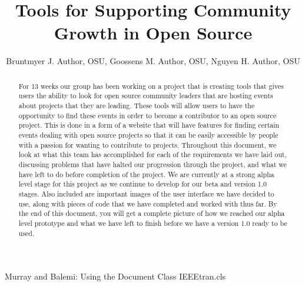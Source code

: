\documentclass[letterpaper,10pt,onecolumn]{IEEEtran} %
\begin{document}
\title{Tools for Supporting Community Growth in Open Source } %

\author{Bruntmyer J. Author, OSU, Goossens M. Author, OSU, Nguyen H. Author, OSU}

{Murray and Balemi: Using the Document Class IEEEtran.cls} %


\maketitle

\begin{abstract}
For 13 weeks our group has been working on a project that is creating tools that gives users the ability to look for open source community leaders that are hosting events about projects that they are leading. These tools will allow users to have the opportunity to find these events in order to become a contributor to an open source project. This is done in a form of a website that will have features for finding certain events dealing with open source projects so that it can be easily accessible by people with a passion for wanting to contribute to projects. Throughout this document, we look at what this team has accomplished for each of the requirements we have laid out, discussing problems that have halted our progression through the project, and what we have left to do before completion of the project. We are currently at a strong alpha level stage for this project as we continue to develop for our beta and version 1.0 stages. Also included are important images of the user interface we have decided to use, along with pieces of code that we have completed and worked with thus far. By the end of this document, you will get a complete picture of how we reached our alpha level prototype and what we have left to finish before we have a version 1.0 ready to be used.
\end{abstract}

\newpage
\end{document}
